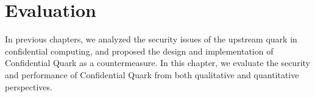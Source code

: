 \chapter{Evaluation}
\label{sec:evaluation}

In previous chapters, we analyzed the security issues of the upstream quark in confidential computing, and proposed the design and implementation of Confidential Quark as a countermeasure. In this chapter, we evaluate the security and performance of Confidential Quark from both 
qualitative and quantitative perspectives.
